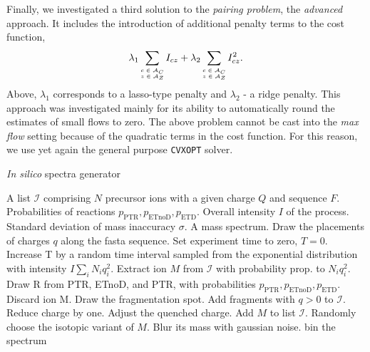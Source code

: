 \documentclass[journal=ancham, manuscript=article, layout=twocolumn]{achemso}
\begin{document}
Finally, we investigated a third solution to the \textit{pairing problem}, the \textit{advanced} approach.
It includes the introduction of additional penalty terms to the cost function, 
\begin{equation*}
	\lambda_1 \sum_{
	 \mbox{\tiny$\begin{matrix} 
		c \in \mathcal{A}_C \\
		z \in \mathcal{A}_Z
	\end{matrix}$}} I_{cz} + 
	\lambda_2 \sum_{
	 \mbox{\tiny$\begin{matrix} 
		c \in \mathcal{A}_C \\
		z \in \mathcal{A}_Z
	\end{matrix}$}} I_{cz}^2.
\end{equation*}
Above, $\lambda_1$ corresponds to a lasso-type penalty and $\lambda_2$ - a ridge penalty. 
This approach was investigated mainly for its ability to automatically round the estimates of small flows to zero.
The above problem cannot be cast into the \textit{max flow} setting because of the quadratic terms in the cost function. 
For this reason, we use yet again the general purpose {\tt CVXOPT} solver.



\begin{algorithm}\scriptsize
	\caption{\textit{In silico} spectra generator}\label{alg::simulation}
	\begin{algorithmic}
		\State
		\INPUT
			\State A list $\mathcal{I}$ comprising $N$ precursor ions with a given charge $Q$ and sequence $F$.
			\State Probabilities of reactions $p_\text{PTR}, p_\text{ETnoD}, p_\text{ETD}$.
			\State Overall intensity $I$ of the process.
			\State Standard deviation of mass inaccuracy $\sigma$.
		\OUTPUT 
		\State A mass spectrum.
		\State
		\State Draw the placements of charges $q$ along the fasta sequence.
		\State Set experiment time to zero, $T = 0$.
			\State Increase T by a random time interval sampled from 
			\State \quad the exponential distribution with intensity $I\sum_i N_i q_i^2$.
			\State Extract ion $M$ from $\mathcal{I}$ with probability prop. to $N_i q_i^2$.  
			\State Draw R from PTR, ETnoD, and PTR,
			\State \quad with probabilities $p_\text{PTR}, p_\text{ETnoD}, p_\text{ETD}$.
					\State Discard ion M.
				\Else
					\State Draw the fragmentation spot.
					\State Add fragments with $q>0$ to $\mathcal{I}$.
				\EndIf
			\Else	
				\State Reduce charge by one.
				\State Adjust the quenched charge.
				\State Add $M$ to list $\mathcal{I}$.
			\EndIf
		\EndWhile
			\State Randomly choose the isotopic variant of $M$.
			\State Blur its mass with gaussian noise.
		\EndFor
		\State bin the spectrum 
	\end{algorithmic}
\end{algorithm}
\end{document}
